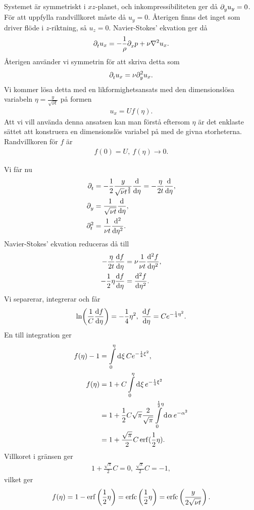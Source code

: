 Systemet är symmetriskt i $xz$-planet, och inkompressibiliteten ger då $\del{y}{u_{y}} = 0$. För att uppfylla randvillkoret måste då $u_{y} = 0$. Återigen finns det inget som driver flöde i $z$-riktning, så $u_{z} = 0$. Navier-Stokes' ekvation ger då
\begin{align*}
	\del{t}{u_{x}} = -\frac{1}{\rho}\del{x}{p} + \nu\laplacian{u_{x}}.
\end{align*}
Återigen använder vi symmetrin för att skriva detta som
\begin{align*}
	\del{t}{u_{x}} = \nu\del[2]{y}{u_{x}}.
\end{align*}
Vi kommer lösa detta med en likformighetsansats med den dimensionslösa variabeln $\eta = \frac{y}{\sqrt{\nu t}}$ på formen
\begin{align*}
	u_{x} = Uf(\eta).
\end{align*}
Att vi vill använda denna ansatsen kan man förstå eftersom $\eta$ är det enklaste sättet att konstruera en dimensionslös variabel på med de givna storheterna. Randvillkoren för $f$ är
\begin{align*}
	f(0) = U,\ f(\eta) \to 0.
\end{align*}

Vi får nu
\begin{align*}
	\del{t}{}    &= -\frac{1}{2}\frac{y}{\sqrt{\nu}t^{\frac{3}{2}}}\dv{\eta} = -\frac{\eta}{2t}\dv{\eta}, \\
	\del{y}{}    &= \frac{1}{\sqrt{\nu t}}\dv{\eta}, \\
	\del[2]{t}{} &= \frac{1}{\nu t}\dv[2]{\eta}.
\end{align*}
Navier-Stokes' ekvation reduceras då till
\begin{align*}
	-\frac{\eta}{2t}\dv{f}{\eta} &= \nu\frac{1}{\nu t}\dv[2]{f}{\eta}, \\
	-\frac{1}{2}\eta\dv{f}{\eta} &= \dv[2]{f}{\eta}.
\end{align*}
Vi separerar, integrerar och får
\begin{align*}
	\ln(\frac{1}{C}\dv{f}{\eta}) = -\frac{1}{4}\eta^{2},\ \dv{f}{\eta} = Ce^{-\frac{1}{4}\eta^{2}}.
\end{align*}
En till integration ger
\begin{align*}
	f(\eta) - 1 &= \integ{0}{\eta}{\xi}{Ce^{-\frac{1}{4}\xi^{2}}}, \\
	f(\eta)     &= 1 + C\integ{0}{\eta}{\xi}{e^{-\frac{1}{4}\xi^{2}}} \\
	            &= 1 + \frac{1}{2}C\sqrt{\pi}\frac{2}{\sqrt{\pi}}\integ{0}{\frac{1}{2}\eta}{\alpha}{e^{-\alpha^{2}}} \\
	            &= 1 + \frac{\sqrt{\pi}}{2}C\erf(\frac{1}{2}\eta).
\end{align*}
Villkoret i gränsen ger
\begin{align*}
	1 + \frac{\sqrt{\pi}}{2}C = 0,\ \frac{\sqrt{\pi}}{2}C = -1,
\end{align*}
vilket ger
\begin{align*}
	f(\eta) = 1 - \erf\left(\frac{1}{2}\eta\right) = \erfc\left(\frac{1}{2}\eta\right) = \erfc\left(\frac{y}{2\sqrt{\nu t}}\right).
\end{align*}

